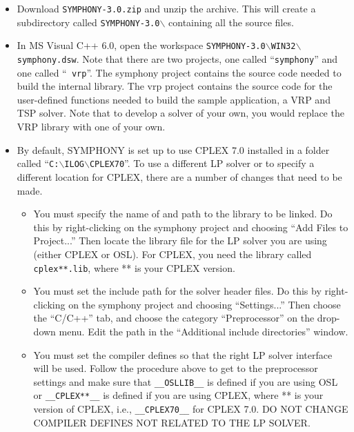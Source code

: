 \begin{itemize}

\item Download {\tt SYMPHONY-3.0.zip} and unzip the archive. This will
create a subdirectory called {\tt SYMPHONY-3.0$\backslash$} containing all 
the source files.

\item In MS Visual C++ 6.0, open the workspace 
{\tt SYMPHONY-3.0$\backslash$WIN32$\backslash$symphony.dsw}.  Note that
there are two projects, one called ``{\tt symphony}'' and one called ``{\tt
vrp}''.  The symphony project contains the source code needed to build the
internal library. The vrp project contains the source code for the
user-defined functions needed to build the sample application, a VRP and TSP
solver. Note that to develop a solver of your own, you would replace the VRP
library with one of your own.

\item By default, SYMPHONY is set up to use CPLEX 7.0 installed in a folder
called ``{\tt C:$\backslash$ILOG$\backslash$CPLEX70}''. To use a different LP 
solver or to specify a different location for CPLEX, there are a number of 
changes that need to be made.

\begin{itemize}

\item You must specify the name of and path to the library to be linked. Do 
this by right-clicking on the symphony project and choosing ``Add Files to
Project...'' Then locate the library file for the LP solver you are using
(either CPLEX or OSL). For CPLEX, you need the library called {\tt
cplex**.lib}, where ** is your CPLEX version.

\item You must set the include path for the solver header files. Do this
by right-clicking on the symphony project and choosing ``Settings...'' Then
choose the ``C/C++'' tab, and choose the category ``Preprocessor'' on the
drop-down menu.  Edit the path in the ``Additional include directories'' 
window.

\item You must set the compiler defines so that the right LP solver interface
will be used. Follow the procedure above to get to the preprocessor settings
and make sure that {\tt \_\_OSLLIB\_\_} is defined if you are using OSL or
{\tt \_\_CPLEX**\_\_} is defined if you are using CPLEX, where ** is your
version of CPLEX, i.e., {\tt \_\_CPLEX70\_\_} for CPLEX 7.0. DO NOT CHANGE
COMPILER DEFINES NOT RELATED TO THE LP SOLVER.


\end{itemize}
\end{itemize}
